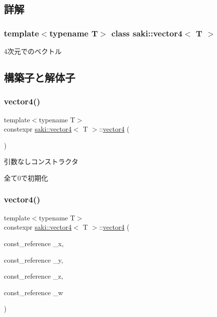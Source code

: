 \subsection{詳解}
\subsubsection*{template$<$typename T$>$\newline
class saki\+::vector4$<$ T $>$}

4次元でのベクトル 

\subsection{構築子と解体子}
\mbox{\label{classsaki_1_1vector4_a79dd4b2f31976d739dd7c6a3a799cd5b}} 
\subsubsection{\texorpdfstring{vector4()}{vector4()}\hspace{0.1cm}{\footnotesize\ttfamily [1/4]}}
{\footnotesize\ttfamily template$<$typename T$>$ \\
constexpr \mbox{\hyperlink{classsaki_1_1vector4}{saki\+::vector4}}$<$ T $>$\+::\mbox{\hyperlink{classsaki_1_1vector4}{vector4}} (\begin{DoxyParamCaption}{ }\end{DoxyParamCaption})\hspace{0.3cm}{\ttfamily [inline]}}



引数なしコンストラクタ 

全て0で初期化 \mbox{\label{classsaki_1_1vector4_a49fe2f8b17fc93ffb433fcceec620ae0}} 
\subsubsection{\texorpdfstring{vector4()}{vector4()}\hspace{0.1cm}{\footnotesize\ttfamily [2/4]}}
{\footnotesize\ttfamily template$<$typename T$>$ \\
constexpr \mbox{\hyperlink{classsaki_1_1vector4}{saki\+::vector4}}$<$ T $>$\+::\mbox{\hyperlink{classsaki_1_1vector4}{vector4}} (\begin{DoxyParamCaption}\item[{const\+\_\+reference}]{\+\_\+x,  }\item[{const\+\_\+reference}]{\+\_\+y,  }\item[{const\+\_\+reference}]{\+\_\+z,  }\item[{const\+\_\+reference}]{\+\_\+w }\end{DoxyParamCaption})\hspace{0.3cm}{\ttfamily [inline]}}



